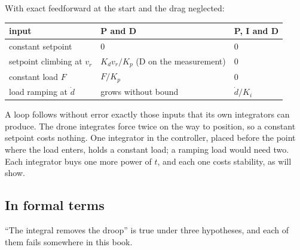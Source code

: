 
\begin{result}
With exact feedforward at the start and the drag neglected:
\begin{center}\small
\renewcommand{\arraystretch}{1.3}
\begin{tabular}{@{}lll@{}}
\toprule
input & P and D & P, I and D\\
\midrule
constant setpoint & $0$ & $0$\\
setpoint climbing at $v_r$ & $K_d v_r/K_p$ \;(D on the measurement) & $0$\\
constant load $F$ & $F/K_p$ & $0$\\
load ramping at $\dot d$ & grows without bound & $\dot d/K_i$\\
\bottomrule
\end{tabular}
\end{center}
\end{result}

\begin{keyidea}
A loop follows without error exactly those inputs that its own integrators can produce. The drone integrates force twice on the way to position, so a constant setpoint costs nothing. One integrator in the controller, placed before the point where the load enters, holds a constant load; a ramping load would need two. Each integrator buys one more power of $t$, and each one costs stability, as  will show.
\end{keyidea}

\subsection{In formal terms}
\enquote{The integral removes the droop} is true under three hypotheses, and each of them fails somewhere in this book.

